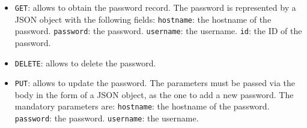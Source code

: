 \begin{itemize}
    \item \texttt{GET}: allows to obtain the password record. The password is represented by a JSON object with the following fields:
        \subitem \texttt{hostname}: the hostname of the password.
        \subitem \texttt{password}: the password.
        \subitem \texttt{username}: the username.
        \subitem \texttt{id}: the ID of the password.
    \item \texttt{DELETE}: allows to delete the password.
    \item \texttt{PUT}: allows to update the password. The parameters must be passed via the body in the form of a JSON object, as the one to add a new password. The mandatory parameters are:
        \subitem \texttt{hostname}: the hostname of the password.
        \subitem \texttt{password}: the password.
        \subitem \texttt{username}: the username.
\end{itemize}